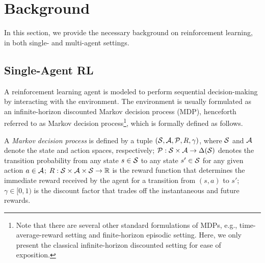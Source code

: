 \section{Background}\label{sec:background}

In this section,  we provide the necessary background on reinforcement learning, in both single- and multi-agent settings. 

\subsection{Single-Agent RL}
A reinforcement learning agent is  modeled to perform sequential decision-making by 
interacting with the environment. The environment is usually formulated as an infinite-horizon discounted Markov decision process (MDP), henceforth referred to as Markov decision process\footnote{Note that there are several other standard formulations of MDPs, e.g., time-average-reward setting and finite-horizon episodic setting. Here, we only present the classical infinite-horizon discounted setting for ease of exposition.}, which is formally defined as follows. 
 

\begin{definition}
	A \emph{Markov decision process} is defined by a tuple $({\mathcal{S}},\mathcal{A},\mathcal{P},R,\gamma)$, where ${\mathcal{S}}$ and $\mathcal{A}$ denote the state and action spaces, respectively;  $\mathcal{P}:{\mathcal{S}}\times\mathcal{A}\to\Delta({\mathcal{S}})$ denotes the transition probability from any state $s\in{\mathcal{S}}$ to any state $s'\in{\mathcal{S}}$ for any given action $a\in\mathcal{A}$; $R:{\mathcal{S}}\times\mathcal{A}\times{\mathcal{S}}\to\mathbb{R}$ is the reward function that determines the immediate reward received by the agent for a transition from $(s,a)$ to $s'$; $\gamma\in[0,1)$ is the discount factor that trades off the instantaneous and future rewards. 
\end{definition}


